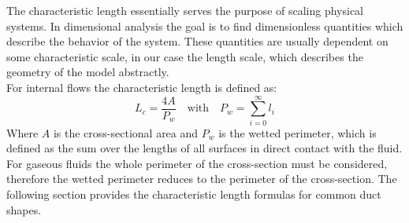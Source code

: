 The characteristic length essentially serves the purpose of scaling physical systems.
In dimensional analysis the goal is to find dimensionless quantities which describe the behavior of the system.
These quantities are usually dependent on some characteristic scale, in our case the length scale, which describes the geometry of the model abstractly.\\
For internal flows the characteristic length is defined as:
$$
	L_c=\frac{4A}{P_w} \quad \text{with} \quad P_w = \sum^{\infty}_{i=0} l_i
$$
Where $A$ is the cross-sectional area and $P_w$ is the wetted perimeter, which is defined as the sum over the lengths of all surfaces in direct contact with the fluid.
For gaseous fluids the whole perimeter of the cross-section must be considered, therefore the wetted perimeter reduces to the perimeter of the cross-section.
The following section provides the characteristic length formulas for common duct shapes. 


